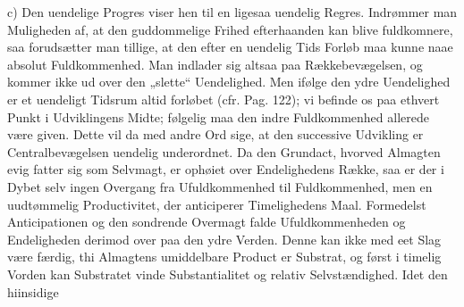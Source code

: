 \documentclass[12pt]{book}
\newcommand{\parag}[2]{%
  \par\vspace{0.9\baselineskip}%
  \begin{center}
    {\bfseries \S\,#1.\par}\vspace{0.2\baselineskip}
    {\bfseries #2\par}
  \end{center}
  \vspace{0.25\baselineskip}
  \phantomsection
  \addcontentsline{toc}{subsubsection}{\texorpdfstring{\S\,#1.\quad #2}{§ #1. #2}}%
}
\newcommand{\divrule}{\begin{center}%
  \rule{0.27\linewidth}{0.9pt}\\[1.6pt]\rule{0.22\linewidth}{0.4pt}\end{center}}
\newcommand{\secrule}{\begin{center}%
  \rule{0.20\linewidth}{0.4pt}\\[1.3pt]\rule{0.20\linewidth}{0.4pt}\end{center}}
\newcommand{\opage}[1]{\marginnote{\footnotesize\textit{[#1]}}}
\begin{document}
c) Den uendelige Progres viser hen til en ligesaa uendelig Regres. Indrømmer man
Muligheden af, at den guddommelige Frihed efterhaanden kan blive fuldkomnere, saa
forudsætter man tillige, at den efter en uendelig Tids Forløb maa kunne naae absolut
Fuldkommenhed. Man indlader sig altsaa paa Rækkebevægelsen, og kommer ikke ud over den
„slette“ Uendelighed. Men ifølge den ydre Uendelighed er et uendeligt Tidsrum altid
forløbet (cfr. Pag. 122); vi befinde os paa ethvert Punkt i Udviklingens Midte; følgelig
maa den indre Fuldkommenhed allerede være given. Dette vil da med andre Ord sige, at den
successive Udvikling er Centralbevægelsen uendelig underordnet. Da den Grundact, hvorved
Almagten evig fatter sig som Selvmagt, er ophøiet over Endelighedens Række, saa er der i
Dybet selv ingen Overgang fra Ufuldkommenhed til Fuldkommenhed, men en uudtømmelig
Productivitet, der anticiperer Timelighedens Maal. Formedelst Anticipationen og den
sondrende Overmagt falde Ufuldkommenheden og Endeligheden derimod over paa den ydre
Verden. Denne kan ikke med eet Slag være færdig, thi Almagtens umiddelbare Product er
Substrat, og først i timelig Vorden kan Substratet vinde Substantialitet og relativ
Selvstændighed. Idet den hiinsidige
\opage{203} %
%
\end{document}
